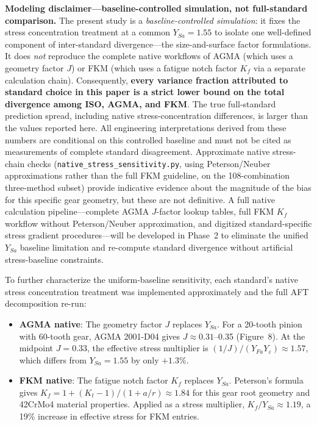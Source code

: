 \documentclass[twocolumn,12pt,a4paper]{article}
\begin{document}
\textbf{Modeling disclaimer---baseline-controlled simulation, not
full-standard comparison.} The present study is a
\emph{baseline-controlled simulation}: it fixes the stress
concentration treatment at a common $Y_{Sa}=1.55$ to isolate one
well-defined component of inter-standard divergence---the size-and-surface
factor formulations. It does \emph{not} reproduce the complete native
workflows of AGMA (which uses a geometry factor $J$) or FKM (which
uses a fatigue notch factor $K_f$ via a separate calculation chain).
Consequently, \textbf{every variance fraction attributed to standard
choice in this paper is a strict lower bound on the total divergence
among ISO, AGMA, and FKM}. The true full-standard prediction spread,
including native stress-concentration differences, is larger than the
values reported here. All engineering interpretations derived from
these numbers are conditional on this controlled baseline and must not
be cited as measurements of complete standard disagreement.
Approximate native stress-chain checks (\texttt{native\_stress\_sensitivity.py},
using Peterson/Neuber approximations rather than the full FKM
guideline, on the 108-combination three-method subset) provide indicative
evidence about the magnitude of the bias for this specific gear
geometry, but these are not definitive. A full native calculation pipeline---complete
AGMA $J$-factor lookup tables, full FKM $K_f$ workflow without
Peterson/Neuber approximation, and digitized standard-specific stress
gradient procedures---will be developed in Phase~2 to eliminate the
unified $Y_{Sa}$ baseline limitation and re-compute standard
divergence without artificial stress-baseline constraints.

To further characterize the uniform-baseline sensitivity, each
standard's native stress concentration treatment was implemented
approximately and the full AFT decomposition re-run:

\begin{itemize}
  \item \textbf{AGMA native}: The geometry factor $J$ replaces
        $Y_{Sa}$. For a 20-tooth pinion with 60-tooth gear, AGMA
        2001-D04 gives $J \approx 0.31$--0.35 (Figure~8). At the
        midpoint $J=0.33$, the effective stress multiplier is
        $(1/J)/(Y_{Fa}Y_\varepsilon) \approx 1.57$, which differs
        from $Y_{Sa}=1.55$ by only $+1.3$\%.
  \item \textbf{FKM native}: The fatigue notch factor $K_f$ replaces
        $Y_{Sa}$. Peterson's formula gives
        $K_f = 1 + (K_t-1)/(1+a/r) \approx 1.84$ for this gear
        root geometry and 42CrMo4 material properties. Applied as a
        stress multiplier, $K_f/Y_{Sa} \approx 1.19$, a 19\% increase
        in effective stress for FKM entries.
\end{itemize}
\end{document}
